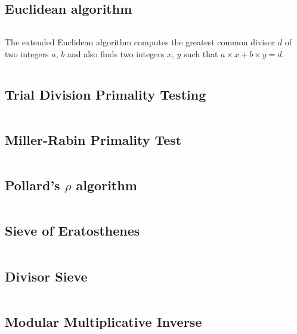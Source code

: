 \documentclass[9pt,a4paper,twocolumn,landscape,oneside]{amsart}
\newcommand{\code}[1]{\inputminted{cpp}{_code/#1}}
\newif\ifverbose
\begin{document}
    \subsection{Euclidean algorithm}
        \ifverbose
        The Euclidean algorithm computes the greatest common divisor of two
        integers $a$, $b$.
        \fi
        \code{mathematics/gcd.cpp}

        The extended Euclidean algorithm computes the greatest common divisor
        $d$ of two integers $a$, $b$ and also finds two integers $x$, $y$ such
        that $a\times x + b\times y = d$.
        \code{mathematics/egcd.cpp}

    \subsection{Trial Division Primality Testing}
        \ifverbose
        An optimized trial division to check whether an integer is prime.
        \fi
        \code{mathematics/is_prime.cpp}

    \subsection{Miller-Rabin Primality Test}
        \ifverbose
        The Miller-Rabin probabilistic primality test.
        \fi
        \code{mathematics/miller_rabin.cpp}

    \subsection{Pollard's $\rho$ algorithm}
        \code{mathematics/pollard_rho.cpp}

    \subsection{Sieve of Eratosthenes}
        \ifverbose
        An optimized implementation of Eratosthenes' Sieve.
        \fi
        \code{mathematics/prime_sieve.cpp}

    \subsection{Divisor Sieve}
        \ifverbose
        A O(n) prime sieve. Computes the smallest divisor of any number up to n.
        \fi
        \code{mathematics/divisor_sieve.cpp}

    \subsection{Modular Multiplicative Inverse}
        \ifverbose
        A function to find a modular multiplicative inverse.
        \fi
        \code{mathematics/mod_inv.cpp}
\end{document}
